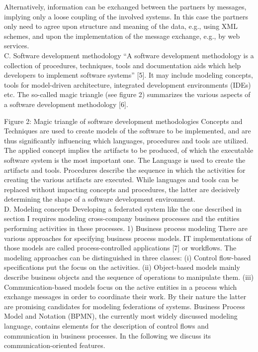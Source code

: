 Alternatively, information can be exchanged between the partners by messages, implying only a loose coupling of the involved systems. In this case the partners only need to agree upon structure and meaning of the data, e.g., using XML schemes, and upon the implementation of the message exchange, e.g., by web services. 
\\
C.	Software development methodology
“A software development methodology is a collection of procedures, techniques, tools and documentation aids which help developers to implement software systems” [5]. It may include modeling concepts, tools for model-driven architecture, integrated development environments (IDEs) etc. The so-called magic triangle (see figure 2) summarizes the various aspects of a software development methodology [6].

Figure 2: Magic triangle of software development methodologies
Concepts and Techniques are used to create models of the software to be implemented, and are thus significantly influencing which languages, procedures and tools are utilized. The applied concept implies the artifacts to be produced, of which the executable software system is the most important one. The Language is used to create the artifacts and tools. Procedures describe the sequence in which the activities for creating the various artifacts are executed. While languages and tools can be replaced without impacting concepts and procedures, the latter are decisively determining the shape of a software development environment.
\\
D.	Modeling concepts
Developing a federated system like the one described in section I requires modeling cross-company business processes and the entities performing activities in these processes.
1)	Business process modeling
There are various approaches for specifying business process models. IT implementations of those models are called process-controlled applications [7] or workflows. The modeling approaches can be distinguished in three classes: (i) Control flow-based specifications put the focus on the activities. (ii) Object-based models mainly describe business objects and the sequence of operations to manipulate them. (iii) Communication-based models focus on the active entities in a process which exchange messages in order to coordinate their work.
By their nature the latter are promising candidates for modeling federations of systems. Business Process Model and Notation (BPMN), the currently most widely discussed modeling language, contains elements for the description of control flows and communication in business processes. In the following we discuss its communication-oriented features.
